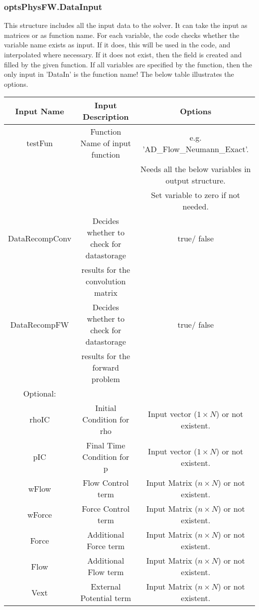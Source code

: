 \documentclass[11pt, a4paper]{article}
\theoremstyle{definition}
\begin{document}
\subsubsection{optsPhysFW.DataInput}	
This structure includes all the input data to the solver. It can take the input as matrices or as function name. For each variable, the code checks whether the variable name exists as input. If it does, this will be used in the code, and interpolated where necessary. If it does not exist, then the field is created and filled by the given function. If all variables are specified by the function, then the only input in 'DataIn' is the function name! The below table illustrates the options. \\

	
 \begin{center}
	\begin{tabular}{ |c| c | c|}
		\hline
		Input Name & Input Description & Options \\ 
		\hline
		testFun & Function Name of input function & e.g. 'AD\_Flow\_Neumann\_Exact'. \\
		& & Needs all the below variables in output structure. \\
	 	& & Set variable to zero if not needed. \\ 
	 	DataRecompConv & Decides whether to check for datastorage & true/ false\\
	 	& results for the convolution matrix &\\
	 	DataRecompFW & Decides whether to check for datastorage & true/ false\\
	 	& results for the forward problem &\\
		\hline
		Optional: & & \\
		\hline
		rhoIC & Initial Condition for rho & Input vector ($1 \times N$) or not existent.\\
		pIC & Final Time Condition for p & Input vector ($1 \times N$) or not existent.\\ 
		wFlow & Flow Control term & Input Matrix ($n \times N$) or not existent. \\
		wForce & Force Control term & Input Matrix ($n \times N$) or not existent. \\
		Force & Additional Force term  & Input Matrix ($n \times N$) or not existent. \\
		Flow & Additional Flow  term & Input Matrix ($n \times N$) or not existent. \\
		Vext & External Potential term & Input Matrix ($n \times N$) or not existent. \\
		\hline
	\end{tabular}
 \end{center}		
	
\end{document}
